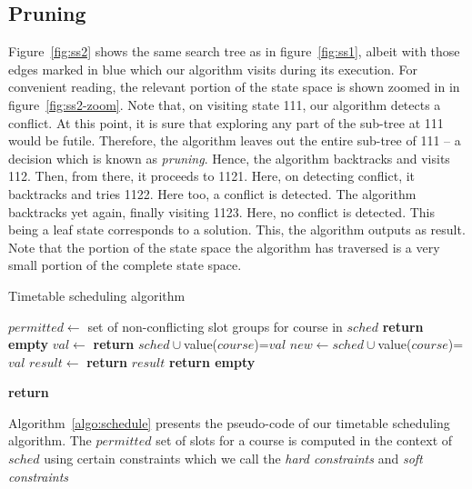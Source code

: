 \documentclass[11pt,a4paper]{article}
\begin{document}
\subsection{Pruning}
Figure~\ref{fig:ss2} shows the same search tree as in figure~\ref{fig:ss1}, albeit with those edges marked in blue which our algorithm visits during its execution. For convenient reading, the relevant portion of the state space is shown zoomed in in figure~\ref{fig:ss2-zoom}. Note that, on visiting state 111, our algorithm detects a conflict. At this point, it is sure that exploring any part of the sub-tree at 111 would be futile. Therefore, the algorithm leaves out the entire sub-tree of 111 -- a decision which is known as \emph{pruning}. Hence, the algorithm backtracks and visits 112. Then, from there, it proceeds to 1121. Here, on detecting conflict, it backtracks and tries 1122. Here too, a conflict is detected. The algorithm backtracks yet again, finally visiting 1123. Here, no conflict is detected. This being a leaf state corresponds to a solution. This, the algorithm outputs as result. Note that the portion of the state space the algorithm has traversed is a very small portion of the complete state space.

\begin{algorithm}
\caption{Timetable scheduling algorithm}
\label{algo:schedule}
\begin{algorithmic}[1]
	\State $permitted \gets$ set of non-conflicting slot groups for course in $sched$
		\State \textbf{return empty}
	\EndIf
		\State $val \gets$ 
		\State \textbf{return} $sched \cup $value($course$)=$val$
	\Else
			\State $new \gets sched \cup $value($course$)=$val$
			\State $result \gets$ 
				\State \textbf{return} $result$
			\EndIf
		\EndFor
		\State \textbf{return empty}
	\EndIf
	
\EndProcedure

\Statex
{}
	\State \textbf{return} 
\EndProcedure

\end{algorithmic}
\end{algorithm}

Algorithm~\ref{algo:schedule} presents the pseudo-code of our timetable scheduling algorithm. The $permitted$ set of slots for a course is computed in the context of $sched$ using certain constraints which we call the \emph{hard constraints} and \emph{soft constraints}
\end{document}
